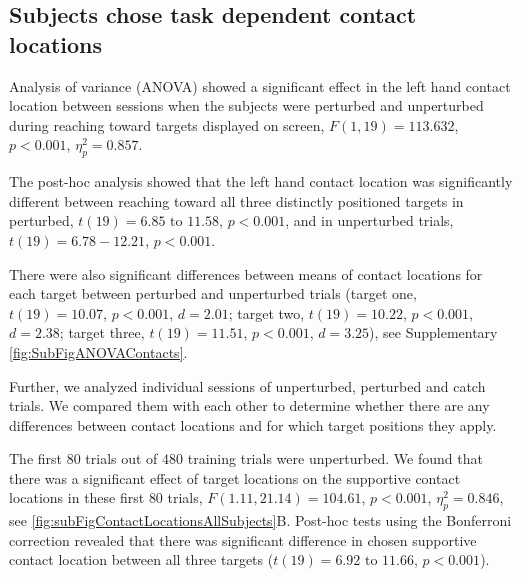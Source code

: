 
\subsection*{Subjects chose task dependent contact locations} 

Analysis of 
variance (ANOVA) showed a significant effect in the left hand contact location between 
sessions when the subjects were perturbed and unperturbed during reaching toward 
targets displayed on screen, $F(1,19) = 113.632$, $p < 0.001$, $\eta_p^2 = 0.857$.

The post-hoc analysis showed that the left hand contact location was significantly 
different between reaching toward all three distinctly positioned targets in 
perturbed, $t(19) = 6.85 \text{ to } 11.58$, $p < 0.001$, and in unperturbed trials, $t(19) = 
6.78-12.21$, $p < 0.001$.

There were also significant differences between means of contact locations for 
each target between perturbed and unperturbed trials (target one, $t(19) = 10.07$, $p 
< 0.001$, $d = 2.01$; target two, $t(19) = 10.22$, $p < 0.001$, $d = 2.38$; target three, $t(19) = 
11.51$, $p < 0.001$, $d = 3.25$), see Supplementary \FigureAbbr 
\ref{fig:SubFigANOVAContacts}.






Further, we analyzed individual sessions of unperturbed, perturbed and catch 
trials. We compared them with each other to determine whether there are any 
differences between contact locations and for which target positions they apply.

The first $80$ trials out of $480$ training trials were unperturbed. We found that 
there was a significant effect of target locations on the supportive contact 
locations in these first $80$ trials, $F(1.11,21.14) = 104.61$, $p < 0.001$, $\eta_p^2 = 
0.846$, see \FigureAbbr \ref{fig:subFigContactLocationsAllSubjects}B. Post-hoc tests using the Bonferroni correction \cite{bland2000introduction} revealed 
that there was significant difference in chosen supportive contact location 
between all three targets ($t(19) = 6.92 \text{ to } 11.66$, $p < 0.001$).

